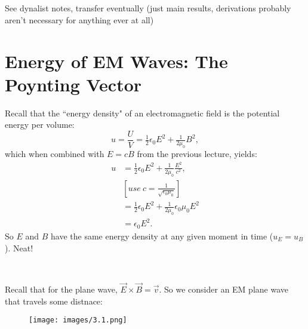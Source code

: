 \documentclass{article}
\begin{document}

\section{}

See dynalist notes, transfer eventually (just main results, derivations probably aren't necessary for anything ever at all)

\section{Energy of EM Waves: The Poynting Vector}

Recall that the ``energy density" of an electromagnetic field is the potential energy per volume:
\begin{equation}
u=\frac{U}{V} =\tfrac{1}{2} \epsilon _{0} E^{2} +\tfrac{1}{2\mu _{0}} B^{2} ,
\end{equation}
which when combined with $E=cB$ from the previous lecture, yields:
\begin{align*}
u & =\tfrac{1}{2} \epsilon _{0} E^{2} +\tfrac{1}{2\mu _{0}}\tfrac{E^{2}}{c^{2}} ,\\
 & \left[ use\ c=\tfrac{1}{\sqrt{\epsilon _{0} \mu _{0}}}\right]\\
 & =\tfrac{1}{2} \epsilon _{0} E^{2} +\tfrac{1}{2\mu _{0}} \epsilon _{0} \mu _{0} E^{2}\\
 & =\epsilon _{0} E^{2} .
\end{align*}
So $E$ and $B$ have the same energy density at any given moment in time ($u_{E} =u_{B}$). Neat!

\

Recall that for the plane wave, $\vec{E} \times \vec{B} =\vec{v}$. So we consider an EM plane wave that travels some distnace:

\begin{figure}[htp]
    \centering
    \texttt{[image: images/3.1.png]}
\end{figure}
\end{document}
